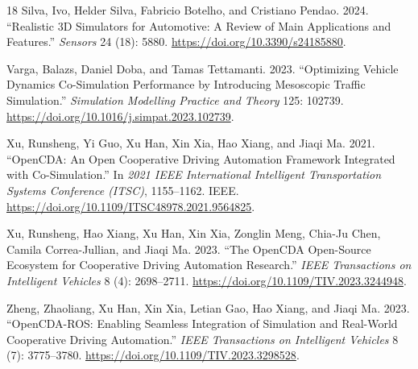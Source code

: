 \documentclass[10pt,numbered]{\selectedmanuscriptclass}
\begin{document}
\begin{thebibliography}{18}
Silva, Ivo, Helder Silva, Fabricio Botelho, and Cristiano Pendao. 2024.
  ``Realistic 3D Simulators for Automotive: A Review of Main Applications and
  Features.'' \emph{Sensors} 24 (18): 5880.
  \url{https://doi.org/10.3390/s24185880}.

Varga, Balazs, Daniel Doba, and Tamas Tettamanti. 2023. ``Optimizing Vehicle
  Dynamics Co-Simulation Performance by Introducing Mesoscopic Traffic
  Simulation.'' \emph{Simulation Modelling Practice and Theory} 125: 102739.
  \url{https://doi.org/10.1016/j.simpat.2023.102739}.

Xu, Runsheng, Yi Guo, Xu Han, Xin Xia, Hao Xiang, and Jiaqi Ma. 2021.
  ``OpenCDA: An Open Cooperative Driving Automation Framework Integrated with
  Co-Simulation.'' In \emph{2021 IEEE International Intelligent Transportation
  Systems Conference (ITSC)}, 1155--1162. IEEE.
  \url{https://doi.org/10.1109/ITSC48978.2021.9564825}.

Xu, Runsheng, Hao Xiang, Xu Han, Xin Xia, Zonglin Meng, Chia-Ju Chen, Camila
  Correa-Jullian, and Jiaqi Ma. 2023. ``The OpenCDA Open-Source Ecosystem for
  Cooperative Driving Automation Research.'' \emph{IEEE Transactions on
  Intelligent Vehicles} 8 (4): 2698--2711.
  \url{https://doi.org/10.1109/TIV.2023.3244948}.

Zheng, Zhaoliang, Xu Han, Xin Xia, Letian Gao, Hao Xiang, and Jiaqi Ma. 2023.
  ``OpenCDA-ROS: Enabling Seamless Integration of Simulation and Real-World
  Cooperative Driving Automation.'' \emph{IEEE Transactions on Intelligent
  Vehicles} 8 (7): 3775--3780.
  \url{https://doi.org/10.1109/TIV.2023.3298528}.

\end{thebibliography}
\end{document}
